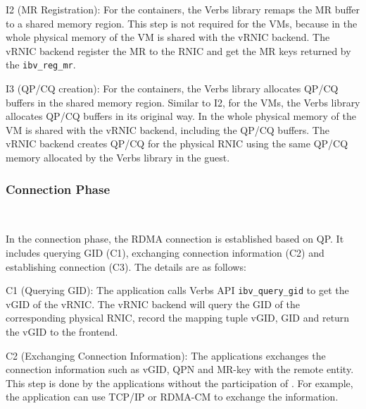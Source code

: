 
I2 (MR Registration): For the containers, the Verbs library remaps the MR buffer to a shared memory region. This step is not required for the VMs, because in \sys the whole physical memory of the VM is shared with the vRNIC backend. The vRNIC backend register the MR to the RNIC and get the MR keys returned by the \texttt{ibv\_reg\_mr}.


I3 (QP/CQ creation): For the containers, the Verbs library allocates QP/CQ buffers in the shared memory region. Similar to I2, for the VMs, the Verbs library allocates QP/CQ buffers in its original way. In \sys the whole physical memory of the VM is shared with the vRNIC backend, including the QP/CQ buffers. The vRNIC backend creates QP/CQ for the physical RNIC using the same QP/CQ memory allocated by the Verbs library in the guest.

\subsubsection{\textbf{Connection Phase}}
\
\noindent

In the connection phase, the RDMA connection is established based on QP. It includes querying GID (C1), exchanging connection information (C2) and establishing connection (C3). The details are as follows:

C1 (Querying GID): The application calls Verbs API \texttt{ibv\_query\_gid} to get the vGID of the vRNIC. The vRNIC backend will query the GID of the corresponding physical RNIC, record the mapping tuple {vGID, GID} and return the vGID to the frontend.

C2 (Exchanging Connection Information): The applications exchanges the connection information such as vGID, QPN and MR-key with the remote entity. This step is done by the applications without the participation of \sys. For example, the application can use TCP/IP or RDMA-CM to exchange the information.

